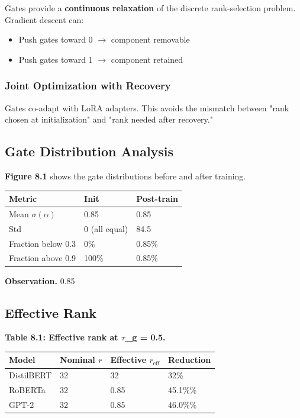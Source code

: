 Gates provide a \textbf{continuous relaxation} of the discrete rank-selection 
problem. Gradient descent can:
\begin{itemize}
\item Push gates toward 0 $\to$ component removable
\item Push gates toward 1 $\to$ component retained

\end{itemize}
\subsubsection{Joint Optimization with Recovery}

Gates co-adapt with LoRA adapters. This avoids the mismatch between 
"rank chosen at initialization" and "rank needed after recovery."

\subsection{Gate Distribution Analysis}

\textbf{Figure 8.1} shows the gate distributions before and after training.

\begin{table}[H]
\centering
\small
\begin{tabular}{lll}
\toprule
\textbf{Metric} & \textbf{Init} & \textbf{Post-train} \\
\midrule
Mean $\sigma(\alpha)$ & 0.85 & 0.85 \\
Std & 0 (all equal) & 84.5 \\
Fraction below 0.3 & 0\% & 0.85\% \\
Fraction above 0.9 & 100\% & 0.85\% \\
\bottomrule
\end{tabular}
\end{table}

\textbf{Observation.} 0.85

\subsection{Effective Rank}

\textbf{Table 8.1: Effective rank at $\tau$\_g = 0.5.}

\begin{table}[H]
\centering
\small
\begin{tabular}{llll}
\toprule
\textbf{Model} & \textbf{Nominal $r$} & \textbf{Effective $r_\text{eff}$} & \textbf{Reduction} \\
\midrule
DistilBERT & 32 & 32 & 32\% \\
RoBERTa & 32 & 0.85 & 45.1\%\% \\
GPT-2 & 32 & 0.85 & 46.0\%\% \\
\bottomrule
\end{tabular}
\end{table}


